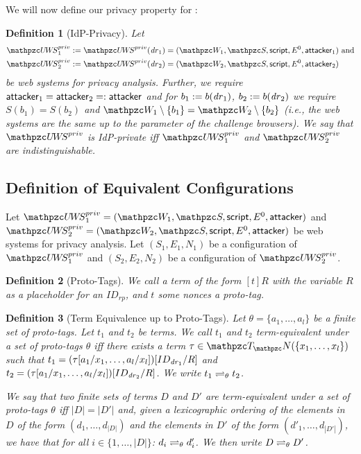 \documentclass[letterpaper,onecolumn,10pt]{article}
\newtheorem{definition}{Definition}
\begin{document}
We will now define our privacy property for \uppresso:

\begin{definition}[IdP-Privacy]\label{def:idp-privacy}
  Let 
  \begin{align*}
    \uppressoprivwebsystem_1 := \uppressoprivwebsystem(\mi{dr}_1) =
    (\bidsystem_1, \scriptset, \mathsf{script}, E^0, \fAP{attacker}_1)&\text{ and}\\
    \uppressoprivwebsystem_2 := \uppressoprivwebsystem(\mi{dr}_2) =
    (\bidsystem_2, \scriptset, \mathsf{script}, E^0, \fAP{attacker}_2)&
  \end{align*}
  be \uppresso web systems for privacy analysis.  Further, we require
  $\mathsf{attacker}_1 = \mathsf{attacker}_2 =: \mathsf{attacker}$ and for $b_1
  := b(\mathit{dr}_1)$, $b_2 := b(\mathit{dr}_2)$ we require $S(b_1) = S(b_2)$
  and $\bidsystem_1 \setminus \{b_1\} = \bidsystem_2 \setminus
  \{b_2\}$ (i.e., the web systems are the same up to the parameter of
  the challenge browsers).  We say that $\uppressoprivwebsystem$ is
  \emph{IdP-private} iff $\uppressoprivwebsystem_1$ and
  $\uppressoprivwebsystem_2$ are indistinguishable.
\end{definition}

\subsection{Definition of Equivalent Configurations}\label{app:defin-equiv-stat}

Let $\uppressoprivwebsystem_1 = (\bidsystem_1, \scriptset, \mathsf{script}, E^0, \fAP{attacker})$ 
and $\uppressoprivwebsystem_2 = (\bidsystem_2, \scriptset, \mathsf{script}, E^0, \fAP{attacker})$ 
be \uppresso web systems for privacy analysis. Let $(S_1,E_1,N_1)$ 
be a configuration of $\uppressoprivwebsystem_1$ and $(S_2,E_2,N_2)$ 
be a configuration of $\uppressoprivwebsystem_2$.

\begin{definition}[Proto-Tags]
  We call a term of the form $[t]R$ with the variable
  $R$ as a placeholder for an $ID_{rp}$, and $t$ some nonces a
  \emph{proto-tag}.
\end{definition}

\begin{definition}[Term Equivalence up to Proto-Tags]
  Let $\theta = \{a_1, \ldots, a_l \}$ be a finite set of proto-tags.
  Let $t_1$ and $t_2$ be terms. We call $t_1$ and $t_2$
  \emph{term-equivalent under a set of proto-tags $\theta$} iff there
  exists a term $\tau \in \terms(\{x_1,\dots,x_l\})$ such that
  $t_1 = (\tau [ a_1 / x_1 , \dots , a_l / x_l ])[ ID_{\mathit{dr}_1} / R ]$ and
  $t_2 = (\tau [ a_1 / x_1 , \dots , a_l / x_l ])[ ID_{\mathit{dr}_2} / R ]$.
  We write $t_1 \rightleftharpoons_{\theta} t_2$.

  We say that two finite sets of terms $D$ and $D'$ are
  \emph{term-equivalent under a set of proto-tags $\theta$} iff
  $|D| = |D'|$ and, given a lexicographic ordering of the elements in
  $D$ of the form $(d_1,\dots,d_{|D|})$ and the elements in $D'$ of
  the form $(d'_1,\dots,d_{|D'|})$, we have that for all
  $i \in \{1,\dots,|D|\}$: $d_i \rightleftharpoons_{\theta} d'_i$. We then
  write $D \rightleftharpoons_{\theta} D'$.
\end{definition}
\end{document}
